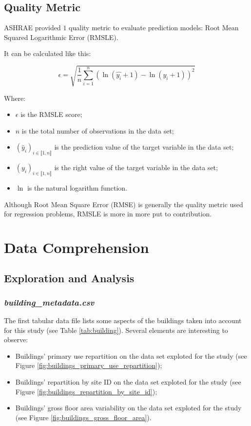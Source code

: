 \documentclass[twocolumn, switch]{article}
\begin{document}
\subsection{Quality Metric} \label{sub:quality_metric}

ASHRAE provided $1$ quality metric to evaluate prediction models: Root Mean Squared Logarithmic Error (RMSLE).

It can be calculated like this:

$$\epsilon = \sqrt{\frac{1}{n} \sum_{i = 1}^{n} \left(\ln(\hat{y_{i}} + 1) - \ln(y_{i} + 1)\right)^{2}}$$

Where:
\begin{itemize}
\item $\epsilon$ is the RMSLE score;
\item $n$ is the total number of observations in the data set;
\item $\left(\hat{y}_{i}\right)_{i \in \llbracket 1, n \rrbracket}$ is the prediction value of the target variable in the data set;
\item $\left(y_{i}\right)_{i \in \llbracket 1, n \rrbracket}$ is the right value of the target variable in the data set;
\item $\ln$ is the natural logarithm function.
\end{itemize}

Although Root Mean Square Error (RMSE) is generally the quality metric used for regression problems, RMSLE is more in more put to contribution.


\section{Data Comprehension}

\subsection{Exploration and Analysis}

\subsubsection{\textit{building\_metadata.csv}}

The first tabular data file lists some aspects of the buildings taken into account for this study (see Table \ref{tab:building}). Several elements are interesting to observe:

\begin{itemize}
\item Buildings' primary use repartition on the data set exploted for the study (see Figure \ref{fig:buildings_primary_use_repartition});
\item Buildings' repartition by site ID on the data set exploted for the study (see Figure \ref{fig:buildings_repartition_by_site_id});
\item Buildings' gross floor area variability on the data set exploted for the study (see Figure \ref{fig:buildings_gross_floor_area}).
\end{itemize}
\end{document}
